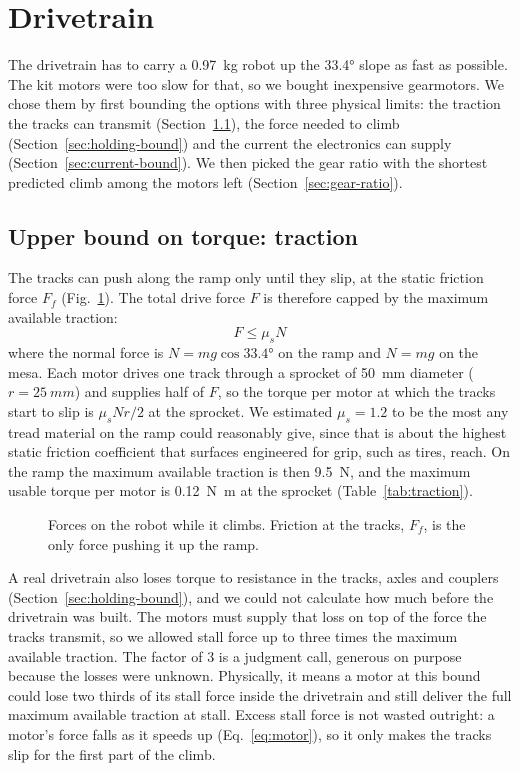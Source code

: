 \section{Drivetrain}
\label{sec:drivetrain}

The drivetrain has to carry a \qty{0.97}{kg} robot up the \ang{33.4} slope as fast as possible. The kit motors were too slow for that, so we bought inexpensive gearmotors. We chose them by first bounding the options with three physical limits: the traction the tracks can transmit (Section~\ref{sec:traction-bound}), the force needed to climb (Section~\ref{sec:holding-bound}) and the current the electronics can supply (Section~\ref{sec:current-bound}). We then picked the gear ratio with the shortest predicted climb among the motors left (Section~\ref{sec:gear-ratio}).

\subsection{Upper bound on torque: traction}
\label{sec:traction-bound}

The tracks can push along the ramp only until they slip, at the static friction force $F_f$ (Fig.~\ref{fig:fbd}). The total drive force $F$ is therefore capped by the maximum available traction:
\begin{equation}
  F \le \mu_s N
  \label{eq:traction}
\end{equation}
where the normal force is $N = m g \cos\ang{33.4}$ on the ramp and $N = m g$ on the mesa. Each motor drives one track through a sprocket of \qty{50}{mm} diameter ($r = \qty{25}{mm}$) and supplies half of $F$, so the torque per motor at which the tracks start to slip is $\mu_s N r / 2$ at the sprocket. We estimated $\mu_s = 1.2$ to be the most any tread material on the ramp could reasonably give, since that is about the highest static friction coefficient that surfaces engineered for grip, such as tires, reach. On the ramp the maximum available traction is then \qty{9.5}{N}, and the maximum usable torque per motor is \qty{0.12}{N.m} at the sprocket (Table~\ref{tab:traction}).

\begin{figure}[htbp]
  \centering
  
  \caption{Forces on the robot while it climbs. Friction at the tracks, $F_f$, is the only force pushing it up the ramp.}
  \label{fig:fbd}
\end{figure}

A real drivetrain also loses torque to resistance in the tracks, axles and couplers (Section~\ref{sec:holding-bound}), and we could not calculate how much before the drivetrain was built. The motors must supply that loss on top of the force the tracks transmit, so we allowed stall force up to three times the maximum available traction. The factor of 3 is a judgment call, generous on purpose because the losses were unknown. Physically, it means a motor at this bound could lose two thirds of its stall force inside the drivetrain and still deliver the full maximum available traction at stall. Excess stall force is not wasted outright: a motor's force falls as it speeds up (Eq.~\eqref{eq:motor}), so it only makes the tracks slip for the first part of the climb.

